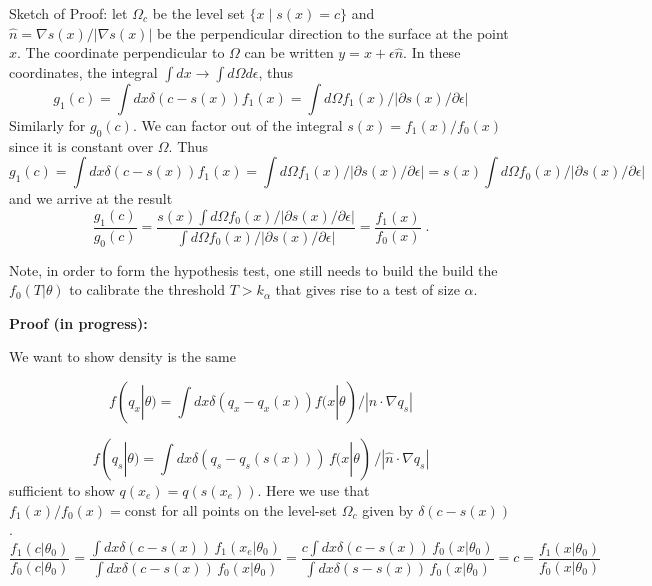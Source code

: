 \documentclass[11pt, oneside]{article}   	%
\begin{document}
Sketch of Proof: 
let $\Omega_{c}$ be the level set $\{x \mid s(x) = c \}$ and $\hat{n}=\nabla s(x) / |\nabla s(x)|$ be the perpendicular direction to the surface at the point $x$. The  coordinate perpendicular to $\Omega$ can be written $y = x+\epsilon \hat{n}$. In these coordinates, the integral $\int dx \to \int d\Omega d\epsilon$, thus
\begin{equation}
g_1(c) = \int dx \delta(c-s(x)) f_1(x) = \int d\Omega f_1(x) / |\partial s(x)/\partial \epsilon|
\end{equation}
Similarly for $g_0(c)$. We can factor out of the integral $s(x)=f_1(x)/f_0(x)$ since it is constant over $\Omega$.
Thus
\begin{equation}
g_1(c) = \int dx \delta(c-s(x)) f_1(x) = \int d\Omega f_1(x) / |\partial s(x)/\partial \epsilon| = s(x) \int d\Omega f_0(x) / |\partial s(x)/\partial \epsilon|
\end{equation}
and we arrive at the result
\begin{equation}
\frac{g_1(c)}{g_0(c)} = \frac{s(x) \int d\Omega f_0(x) / |\partial s(x)/\partial \epsilon|}{ \int d\Omega f_0(x) / |\partial s(x)/\partial \epsilon|} = \frac{f_1(x)}{f_0(x)} \;.
\end{equation}







Note, in order to form the hypothesis test, one still needs to build the build the $f_0(T|\theta)$ to calibrate the threshold  $T>k_\alpha$ that gives rise to a test of size $\alpha$. 



\textbf{Proof (in progress):}

We want to show density is the same 

\begin{equation}
f(q_x|\theta) = \int dx \delta(q_x-q_x(x)) f(x|\theta)  / | \hat{n} \cdot \nabla q_s  |
\end{equation}

\begin{equation}
f(q_s|\theta) = \int dx \delta(q_s-q_s(s(x))) \, f(x|\theta) \, / | \hat{n} \cdot \nabla q_s  |
\end{equation}
sufficient to show $q(x_e) = q(s(x_e))$.  Here we use that $f_1(x)/f_0(x)=\textrm{const}$ for all points on the level-set $\Omega_c$ given by $ \delta(c-s(x))$. 
\begin{equation}
\frac {f_1(c | \theta_0) }{ f_0(c | \theta_0) } = 
\frac { \int dx \delta(c-s(x)) \, f_1(x_e | \theta_0) }{ \int dx \delta(c-s(x)) \, f_0(x | \theta_0)  } = 
\frac {c \int dx \delta(c-s(x)) \, f_0(x | \theta_0)  }{ \int dx \delta(s-s(x)) \, f_0(x | \theta_0)  } = c =\frac {f_1(x | \theta_0) }{ f_0(x | \theta_0) } 
\end{equation}
\end{document}
